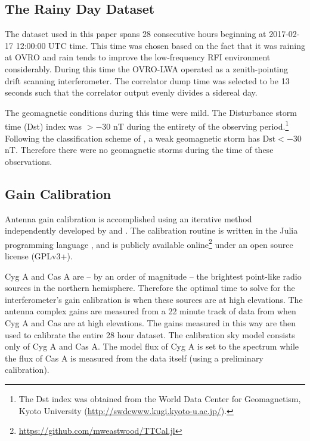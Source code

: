 \documentclass[twocolumn]{aastex61}
\begin{document}
\subsection{The Rainy Day Dataset}

The dataset used in this paper spans 28 consecutive hours beginning at 2017-02-17 12:00:00 UTC time.
This time was chosen based on the fact that it was raining at OVRO and rain tends to improve the
low-frequency RFI environment considerably. During this time the OVRO-LWA operated as a
zenith-pointing drift scanning interferometer.  The correlator dump time was selected to be 13
seconds such that the correlator output evenly divides a sidereal day.

The geomagnetic conditions during this time were mild. The Disturbance storm time (Dst) index was
$>-30$ nT during the entirety of the observing period.\footnote{
    The Dst index was obtained from the World Data Center for Geomagnetism, Kyoto University
    (\url{http://swdcwww.kugi.kyoto-u.ac.jp/}).
}
Following the classification scheme of \citet{2008GMS...181.....K}, a weak geomagnetic storm has
$\text{Dst} < -30$ nT. Therefore there were no geomagnetic storms during the time of these
observations.

\subsection{Gain Calibration}

Antenna gain calibration is accomplished using an iterative method independently developed by
\citet{2008ISTSP...2..707M} and \citet{2014A&A...571A..97S}. The calibration routine is written in
the Julia programming language \citep{doi:10.1137/141000671}, and is publicly available
online\footnote{\url{https://github.com/mweastwood/TTCal.jl}} under an open source license (GPLv3+).

Cyg A and Cas A are -- by an order of magnitude -- the brightest point-like radio sources in the
northern hemisphere. Therefore the optimal time to solve for the interferometer's gain calibration
is when these sources are at high elevations.  The antenna complex gains are measured from a 22
minute track of data from when Cyg A and Cas are at high elevations. The gains measured in this way
are then used to calibrate the entire 28 hour dataset. The calibration sky model consists only of
Cyg A and Cas A. The model flux of Cyg A is set to the \citet{1977A&A....61...99B} spectrum while
the flux of Cas A is measured from the data itself (using a preliminary calibration).
\end{document}
